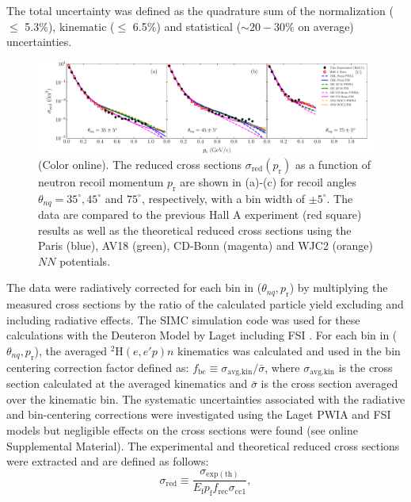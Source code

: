 \documentclass[aps,prl,twocolumn,showpacs,superscriptaddress,groupedaddress]{revtex4-2}  %
\begin{document}
The total uncertainty was defined as the quadrature sum of the normalization ($\leq$ 5.3$\%$), kinematic ($\leq$ 6.5$\%$) and statistical ($\sim20-30\%$ on average) uncertainties.\\
\begin{figure}[t]
\centering        
\includegraphics[scale=0.45]{PRL_plot1.pdf}
\caption{(Color online). The reduced cross sections $\sigma_{\mathrm{red}}(p_{\mathrm{r}})$ as a function of neutron recoil momentum $p_{\mathrm{r}}$ are shown in (a)-(c) for recoil angles $\theta_{nq}=35^{\circ}, 45^{\circ}$ and $75^{\circ}$, respectively,
with a bin width of $\pm 5^{\circ}$. The data are compared to the previous Hall A experiment (red square) results \cite{PhysRevLett.107.262501} as well as the theoretical reduced cross sections using the Paris (blue),
AV18 (green), CD-Bonn (magenta) and WJC2 (orange) $NN$ potentials.}
\label{fig:fig1}
\end{figure}
\indent The data were radiatively corrected for each bin in ($\theta_{nq}, p_{\mathrm{r}}$) by multiplying the measured cross sections by the ratio of the calculated particle yield excluding and including radiative effects.
The SIMC simulation code was used for these calculations with the Deuteron Model by Laget including FSI \cite{LAGET2005}.
For each bin in ($\theta_{nq}, p_{\mathrm{r}}$), the averaged $^{2}\mathrm{H}(e,e'p)n$ kinematics was calculated and used in the bin centering correction factor defined as:
$f_{\mathrm{bc}} \equiv \sigma_{\mathrm{avg.kin}} / \bar{\sigma}$, where $\sigma_{\mathrm{avg.kin}}$ is the cross section calculated at the averaged kinematics and $\bar{\sigma}$ is the cross section averaged
over the kinematic bin. The systematic uncertainties associated with the radiative and bin-centering corrections were investigated using the Laget PWIA and FSI models but negligible effects
on the cross sections were found (see online Supplemental Material). The experimental and theoretical reduced cross sections were extracted and are defined as follows: \\
\begin{equation}
\sigma_{\mathrm{red}} \equiv \frac{\sigma_{\mathrm{exp(th)}}}{E_{\mathrm{f}}p_{\mathrm{f}}f_{\mathrm{rec}}\sigma_{\mathrm{cc1}}},
\label{eq:1}
\end{equation}
\end{document}
